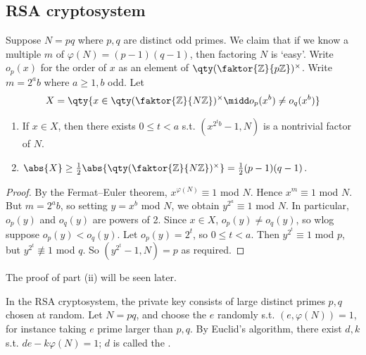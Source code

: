 \subsection{RSA cryptosystem}
Suppose $N = pq$ where $p, q$ are distinct odd primes.
We claim that if we know a multiple $m$ of $\varphi(N) = (p-1)(q-1)$, then factoring $N$ is `easy'.
Write $o_p(x)$ for the order of $x$ as an element of $\qty(\faktor{\mathbb Z}{p\mathbb Z})^\times$.
Write $m = 2^a b$ where $a \geq 1, b$ odd.
Let
\begin{align*}
    X = \qty{x \in \qty(\faktor{\mathbb Z}{N\mathbb Z})^\times \midd o_p(x^b) \neq o_q(x^b)}
\end{align*}
\begin{theorem}
    \begin{enumerate}
        \item If $x \in X$, then there exists $0 \leq t < a$ s.t. $(x^{2^t b} - 1, N)$ is a nontrivial factor of $N$.
        \item $\abs{X} \geq \frac{1}{2} \abs{\qty(\faktor{\mathbb Z}{N\mathbb Z})^\times} = \frac{1}{2}(p-1)(q-1)$.
    \end{enumerate}
\end{theorem}
\begin{proof}
    By the Fermat--Euler theorem, $x^{\varphi(N)} \equiv 1$ mod $N$.
    Hence $x^m \equiv 1$ mod $N$.
    But $m = 2^a b$, so setting $y = x^b$ mod $N$, we obtain $y^{2^a} \equiv 1$ mod $N$.
    In particular, $o_p(y)$ and $o_q(y)$ are powers of 2.
    Since $x \in X$, $o_p(y) \neq o_q(y)$, so wlog suppose $o_p(y) < o_q(y)$.
    Let $o_p(y) = 2^t$, so $0 \leq t < a$.
    Then $y^{2^t} \equiv 1$ mod $p$, but $y^{2^t} \not\equiv 1$ mod $q$.
    So $(y^{2^t} - 1, N) = p$ as required.
\end{proof}
The proof of part (ii) will be seen later.

In the RSA cryptosystem, the private key consists of large distinct primes $p, q$ chosen at random.
Let $N = pq$, and choose the  $e$ randomly s.t. $(e, \varphi(N)) = 1$, for instance taking $e$ prime larger than $p, q$.
By Euclid's algorithm, there exist $d, k$ s.t. $de - k\varphi(N) = 1$; $d$ is called the .

